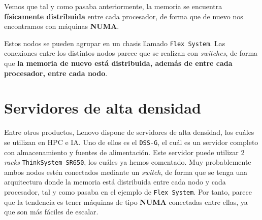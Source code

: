 \documentclass[11pt,a4paper]{article}
\begin{document}
Vemos que tal y como pasaba anteriormente, la memoria se encuentra \textbf{físicamente
distribuida} entre cada procesador, de forma que de nuevo nos encontramos con máquinas
\textbf{NUMA}.

Estos nodos se pueden agrupar en un chasis llamado \texttt{Flex System}. Las conexiones
entre los distintos nodos parece que se realizan con \textit{switches}, de forma que
\textbf{la memoria de nuevo está distribuida, además de entre cada procesador, entre cada nodo}.

\section{Servidores de alta densidad}

Entre otros productos, Lenovo dispone de servidores de alta densidad, los cuáles se utilizan
en HPC e IA. Uno de ellos es el \texttt{DSS-G}, el cuál es un servidor completo con
almacenamiento y fuentes de alimentación. Este servidor puede utilizar 2 \textit{racks}
\texttt{ThinkSystem SR650}, los cuáles ya hemos comentado. Muy probablemente ambos
nodos estén conectados mediante un \textit{switch}, de forma que se tenga una arquitectura
donde la memoria está distribuida entre cada nodo y cada procesador, tal y como pasaba
en el ejemplo de \texttt{Flex System}. Por tanto, parece que la tendencia es tener
máquinas de tipo \textbf{NUMA} conectadas entre ellas, ya que son más fáciles de escalar.
\end{document}
